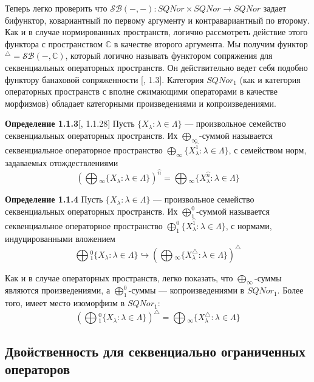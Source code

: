 \documentclass[12pt]{article}
\begin{document}
\medskip

Теперь легко проверить что $\mathcal{SB}(-,-):SQNor\times SQNor\to SQNor$ задает
бифунктор, ковариантный по первому аргументу и контравариантный по второму. Как
и в случае нормированных пространств, логично рассмотреть действие этого
функтора с пространством $\mathbb{C}$ в качестве второго аргумента. Мы получим
функтор ${}^\triangle=\mathcal{SB}(-,\mathbb{C})$, который логично называть
функтором сопряжения для секвенциальных операторных пространств. Он
действительно  ведет себя подобно функтору банаховой сопряженности
[\cite{LamOpFolgen}, 1.3]. Категория $SQNor_1$  (как и категория операторных
пространств с вполне сжимающими операторами в качестве морфизмов) обладает
категорными произведениями и копроизведениями. 

\medskip

{\bf Определение 1.1.3}[\cite{LamOpFolgen}, 1.1.28]\label{DefSQProd} Пусть
$ \{X_\lambda: \lambda \in \Lambda \}$ --- произвольное семейство секвенциальных
операторных пространств. Их $\bigoplus_\infty$-суммой называется секвенциальное
операторное пространство $\bigoplus_\infty \{X_\lambda^{\wideparen{1}}:\lambda\in
\Lambda \}$, с семейством норм, задаваемых отождествлениями 
$$
{\left(\bigoplus{}_\infty \{X_\lambda:\lambda \in \Lambda \}\right)}^{\wideparen{n}}
=\bigoplus{}_\infty \{X_\lambda^{\wideparen{n}}:\lambda\in \Lambda \}
$$

\medskip

{\bf Определение 1.1.4}\label{DefSQCoProd} Пусть $ \{X_\lambda: \lambda \in
\Lambda \}$ --- произвольное семейство секвенциальных операторных пространств. Их
$\bigoplus_1^0$-суммой называется секвенциальное операторное пространство  
$\bigoplus_1^0 \{X_\lambda^{\wideparen{1}}:\lambda\in \Lambda \}$, с нормами,
индуцированными вложением
$$
\bigoplus{}_1^0 \{X_\lambda:\lambda \in \Lambda \}\hookrightarrow
{\left(\bigoplus{}_\infty \{
    X_\lambda^\triangle:\lambda\in \Lambda
 \}\right)}^\triangle
$$

\medskip

Как и в случае операторных пространств, легко показать, что
$\bigoplus_\infty$-суммы являются произведениями, а $\bigoplus_1^0$-суммы ---
копроизведениями в $SQNor_1$. Более того, имеет место изоморфизм в $SQNor_1$:
$$
{\left(\bigoplus{}_1^0 \{X_\lambda:\lambda\in \Lambda \}\right)}^\triangle
=\bigoplus{}_\infty \{X_\lambda^\triangle:\lambda\in \Lambda \}
$$


\subsection{Двойственность для секвенциально ограниченных операторов}
\end{document}
